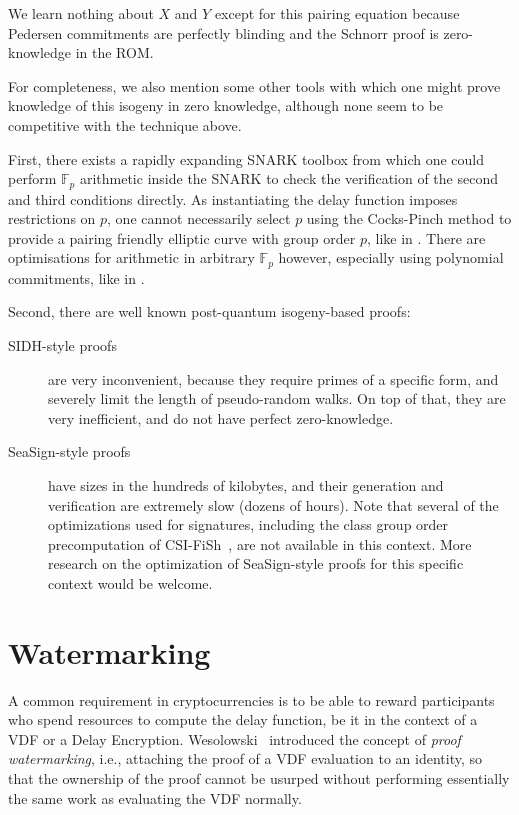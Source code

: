 \documentclass{llncs}
\newcommand{\F}{\mathbb{F}}
\begin{document}
We learn nothing about $X$ and $Y$ except for this pairing equation 
because Pedersen commitments are perfectly blinding and
the Schnorr proof is zero-knowledge in the ROM.

\smallskip

For completeness, we also mention some other tools with which one
might prove knowledge of this isogeny in zero knowledge, although none
seem to be competitive with the technique above.
 
First, there exists a rapidly expanding SNARK toolbox from which
one could perform $\F_p$ arithmetic inside the SNARK to check the
verification of the second and third conditions directly.  
As instantiating the delay function imposes restrictions on $p$,
one cannot necessarily select $p$ using the Cocks-Pinch method to
provide a pairing friendly elliptic curve with group order $p$, 
like in \cite{ZEXE}. %
There are optimisations for arithmetic in arbitrary $\F_p$ 
however, especially using polynomial commitments,
like in \cite{plookup}. %

Second, there are well known post-quantum isogeny-based proofs:
\begin{description}
\item[SIDH-style proofs~\cite{defeo+jao+plut12}] %
  are very inconvenient, because they require primes of a specific
  form, and severely limit the length of pseudo-random walks. %
  On top of that, they are very inefficient, and do not have perfect
  zero-knowledge. %
\item[SeaSign-style proofs~\cite{10.1007/978-3-030-17659-4_26}] %
  have sizes in the hundreds of kilobytes, and their generation and
  verification are extremely slow (dozens of hours). %
  Note that several of the optimizations used for signatures,
  including the class group order precomputation of
  CSI-FiSh~\cite{10.1007/978-3-030-34578-5_9}, are not available in
  this context. %
  More research on the optimization of SeaSign-style proofs for this
  specific context would be welcome.
\end{description}


\section{Watermarking}
\label{sec:watermarking}

A common requirement in cryptocurrencies is to be able to reward
participants who spend resources to compute the delay function, be it
in the context of a VDF or a Delay Encryption. %
Wesolowski~\cite{Wesolowski} introduced the concept of \emph{proof
  watermarking}, i.e., attaching the proof of a VDF evaluation to an
identity, so that the ownership of the proof cannot be usurped without
performing essentially the same work as evaluating the VDF normally.
\end{document}
